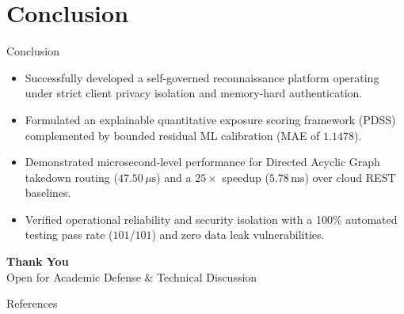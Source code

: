 \documentclass[aspectratio=169,10pt]{beamer}
\begin{document}
\section{Conclusion}

\begin{frame}{Conclusion}
  \normalsize
  \begin{itemize}\setlength{\itemsep}{0.40cm}
    \item Successfully developed a self-governed reconnaissance platform operating under strict client privacy isolation and memory-hard authentication.
    \item Formulated an explainable quantitative exposure scoring framework (PDSS) complemented by bounded residual ML calibration (MAE of $1.1478$).
    \item Demonstrated microsecond-level performance for Directed Acyclic Graph takedown routing ($47.50\,\mu\text{s}$) and a $25\times$ speedup ($5.78\,\text{ms}$) over cloud REST baselines.
    \item Verified operational reliability and security isolation with a 100\% automated testing pass rate ($101/101$) and zero data leak vulnerabilities.
  \end{itemize}
\end{frame}


{
\begin{frame}
  \begin{center}
    \huge
    \textbf{Thank You}\\
    \vspace{0.8cm}
    \Large Open for Academic Defense \& Technical Discussion
  \end{center}
\end{frame}
}

\begin{frame}[allowframebreaks]{References}
  \tiny
  \printbibliography[heading=none]
\end{frame}
\end{document}
